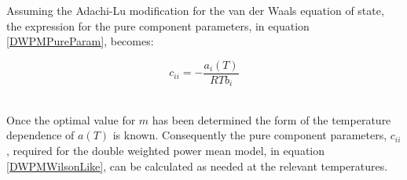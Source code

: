 Assuming the Adachi-Lu modification for the van der Waals equation of state, the expression for the pure component parameters, in equation \ref{DWPMPureParam}, becomes:\

\begin{equation}
  c_{ii} = -\frac{a_{i}\left(T\right)}{RTb_{i}} \label{DWPMPureParamT}
\end{equation}\

Once the optimal value for $m$ has been determined the form of the temperature dependence of $a(T)$ is known. Consequently the pure component parameters, $c_{ii}$, required for the double weighted power mean model, in equation \ref{DWPMWilsonLike}, can be calculated as needed at the relevant temperatures.